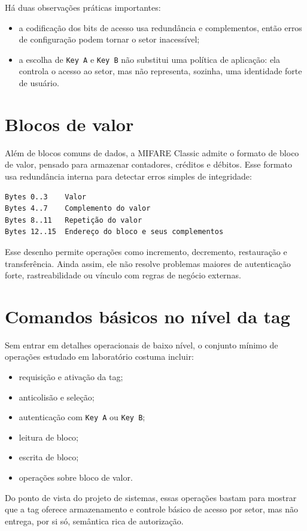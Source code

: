 Há duas observações práticas importantes:
\begin{itemize}[leftmargin=*]
  \item a codificação dos bits de acesso usa redundância e complementos, então erros de configuração podem tornar o setor inacessível;
  \item a escolha de \texttt{Key A} e \texttt{Key B} não substitui uma política de aplicação: ela controla o acesso ao setor, mas não representa, sozinha, uma identidade forte de usuário.
\end{itemize}

\section{Blocos de valor}
Além de blocos comuns de dados, a MIFARE Classic admite o formato de bloco de valor, pensado para armazenar contadores, créditos e débitos. Esse formato usa redundância interna para detectar erros simples de integridade:
\begin{verbatim}
Bytes 0..3    Valor
Bytes 4..7    Complemento do valor
Bytes 8..11   Repetição do valor
Bytes 12..15  Endereço do bloco e seus complementos
\end{verbatim}

Esse desenho permite operações como incremento, decremento, restauração e transferência. Ainda assim, ele não resolve problemas maiores de autenticação forte, rastreabilidade ou vínculo com regras de negócio externas.

\section{Comandos básicos no nível da tag}
Sem entrar em detalhes operacionais de baixo nível, o conjunto mínimo de operações estudado em laboratório costuma incluir:
\begin{itemize}[leftmargin=*]
  \item requisição e ativação da tag;
  \item anticolisão e seleção;
  \item autenticação com \texttt{Key A} ou \texttt{Key B};
  \item leitura de bloco;
  \item escrita de bloco;
  \item operações sobre bloco de valor.
\end{itemize}

Do ponto de vista do projeto de sistemas, essas operações bastam para mostrar que a tag oferece armazenamento e controle básico de acesso por setor, mas não entrega, por si só, semântica rica de autorização.

